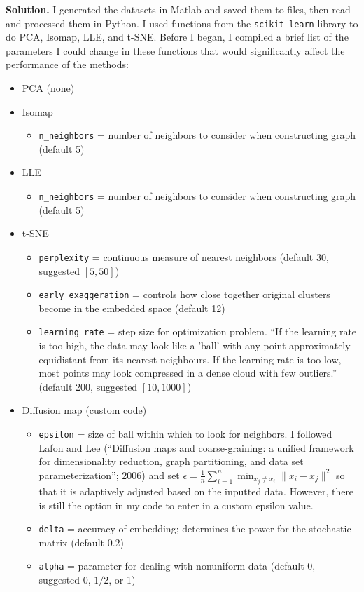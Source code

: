 \documentclass{letter}
\newcounter{problem}
\newcommand{\Solution}[1]{%
	\textbf{Solution.} #1 \par%
}
\begin{document}
    \Solution{I generated the datasets in Matlab and saved them to files, then read and processed them in Python. I used functions from the \texttt{scikit-learn} library to do PCA, Isomap, LLE, and t-SNE. Before I began, I compiled a brief list of the parameters I could change in these functions that would significantly affect the performance of the methods: \begin{itemize}
        \item PCA (none)
        \item Isomap \begin{itemize}
            \item \texttt{n\_neighbors} = number of neighbors to consider when constructing graph (default 5)
        \end{itemize}
        \item LLE \begin{itemize}
            \item \texttt{n\_neighbors} = number of neighbors to consider when constructing graph (default 5)
        \end{itemize}
        \item t-SNE \begin{itemize}
            \item \texttt{perplexity} = continuous measure of nearest neighbors (default 30, suggested $[5, 50]$)
            \item \texttt{early\_exaggeration} = controls how close together original clusters become in the embedded space (default 12)
            \item \texttt{learning\_rate} = step size for optimization problem. ``If the learning rate is too high, the data may look like a 'ball' with any point approximately equidistant from its nearest neighbours. If the learning rate is too low, most points may look compressed in a dense cloud with few outliers.'' (default 200, suggested $[10, 1000]$)
        \end{itemize}
        \item Diffusion map (custom code) \begin{itemize}
            \item \texttt{epsilon} = size of ball within which to look for neighbors. I followed Lafon and Lee (``Diffusion maps and coarse-graining: a unified framework for dimensionality reduction, graph partitioning, and data set parameterization''; 2006) and set $\epsilon = \frac{1}{n}\sum_{i=1}^n \min_{x_j \neq x_i} \|x_i - x_j\|^2$ so that it is adaptively adjusted based on the inputted data. However, there is still the option in my code to enter in a custom epsilon value.
            \item \texttt{delta} = accuracy of embedding; determines the power for the stochastic matrix (default 0.2)
            \item \texttt{alpha} = parameter for dealing with nonuniform data (default 0, suggested 0, $1/2$, or 1)
        \end{itemize}
    \end{itemize}
    
}
\end{document}
